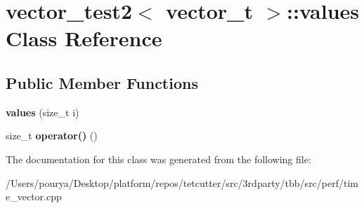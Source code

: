\hypertarget{classvector__test2_1_1values}{}\section{vector\+\_\+test2$<$ vector\+\_\+t $>$\+:\+:values Class Reference}
\label{classvector__test2_1_1values}
\subsection*{Public Member Functions}
\begin{DoxyCompactItemize}
\item 
\hypertarget{classvector__test2_1_1values_adc2cebe903d2346e13d3cb17a6ee9986}{}{\bfseries values} (size\+\_\+t i)\label{classvector__test2_1_1values_adc2cebe903d2346e13d3cb17a6ee9986}

\item 
\hypertarget{classvector__test2_1_1values_a7b18af2a281cb7982630b422176d677c}{}size\+\_\+t {\bfseries operator()} ()\label{classvector__test2_1_1values_a7b18af2a281cb7982630b422176d677c}

\end{DoxyCompactItemize}


The documentation for this class was generated from the following file\+:\begin{DoxyCompactItemize}
\item 
/\+Users/pourya/\+Desktop/platform/repos/tetcutter/src/3rdparty/tbb/src/perf/time\+\_\+vector.\+cpp\end{DoxyCompactItemize}
